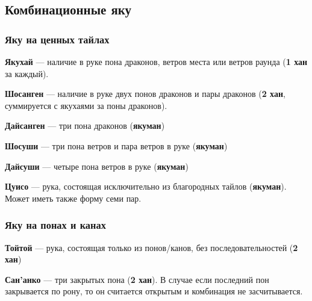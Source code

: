 \subsection{Комбинационные яку}

\subsubsection{Яку на ценных тайлах}

\textbf{Якухай} --- наличие в руке пона драконов, ветров места или ветров раунда (\textbf{1 хан} за каждый).

 \hfill {}

\textbf{Шосанген} --- наличие в руке двух понов драконов и пары драконов (\textbf{2 хан}, суммируется с якухаями за поны драконов).

 \hfill {}

\textbf{Дайсанген} --- три пона драконов (\textbf{якуман})

 \hfill {}

\textbf{Шосуши} --- три пона ветров и пара ветров в руке (\textbf{якуман})

 \hfill {}

\textbf{Дайсуши} --- четыре пона ветров в руке (\textbf{якуман})

 \hfill {}

\textbf{Цуисо} --- рука, состоящая исключительно из благородных тайлов (\textbf{якуман}). Может иметь также форму семи пар.

 \hfill {}

\subsubsection{Яку на понах и канах}

\textbf{Тойтой} --- рука, состоящая только из понов/канов, без последовательностей (\textbf{2 хан})

 \hfill {}

\textbf{Сан'анко} --- три закрытых пона (\textbf{2 хан}). В случае если последний пон закрывается по рону, то он считается открытым и комбинация не засчитывается.

 \hfill {}

